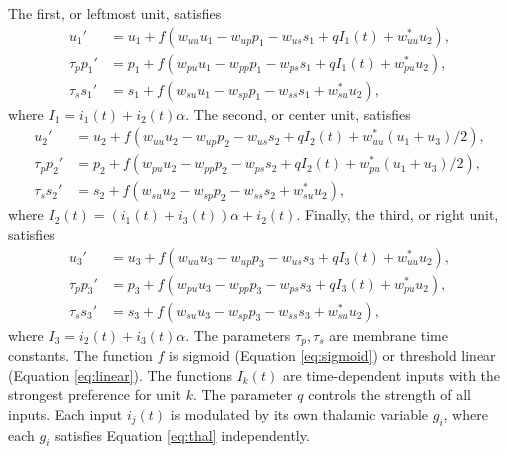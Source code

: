 \documentclass[a4paper,10pt]{article}
\begin{document}
The first, or leftmost unit, satisfies
\begin{align*}
 u_1' &= u_1 + f( w_{uu} u_1 - w_{up}p_1 - w_{us}s_1 + qI_1(t) + w_{uu}^* u_2),\\
 \tau_p p_1' &= p_1 + f( w_{pu} u_1 - w_{pp}p_1 - w_{ps}s_1 + qI_1(t) + w_{pu}^* u_2),\\
 \tau_s s_1' &= s_1 + f( w_{su} u_1 - w_{sp}p_1 - w_{ss}s_1 + w_{su}^* u_2),
\end{align*}
where $I_1 = i_1(t) +i_2(t)\alpha$. The second, or center unit, satisfies
\begin{align*}
 u_2' &= u_2 + f( w_{uu} u_2 - w_{up}p_2 - w_{us}s_2 + qI_2(t) + w_{uu}^* (u_1+u_3)/2),\\
 \tau_p p_2' &= p_2 + f( w_{pu} u_2 - w_{pp}p_2 - w_{ps}s_2 + qI_2(t) + w_{pu}^* (u_1+u_3)/2),\\
 \tau_s s_2' &= s_2 + f( w_{su} u_2 - w_{sp}p_2 - w_{ss}s_2 + w_{su}^* u_2),
\end{align*}
where $I_2(t) = (i_1(t)+i_3(t))\alpha +i_2(t)$. Finally, the third, or right unit, satisfies
\begin{align*}
u_3' &= u_3 + f( w_{uu} u_3 - w_{up}p_3 - w_{us}s_3 + qI_3(t) + w_{uu}^* u_2),\\
 \tau_p p_3' &= p_3 + f( w_{pu} u_3 - w_{pp}p_3 - w_{ps}s_3 + qI_3(t) + w_{pu}^* u_2),\\
 \tau_s s_3' &= s_3 + f( w_{su} u_3 - w_{sp}p_3 - w_{ss}s_3 + w_{su}^* u_2), 
\end{align*}
where $I_3 = i_2(t) +i_3(t)\alpha$. The parameters $\tau_p,\tau_s$ are membrane time constants. The function $f$ is sigmoid (Equation \eqref{eq:sigmoid}) or threshold linear (Equation \eqref{eq:linear}). The functions $I_k(t)$ are time-dependent inputs with the strongest preference for unit $k$. The parameter $q$ controls the strength of all inputs. Each input $i_j(t)$ is modulated by its own thalamic variable $g_i$, where each $g_i$ satisfies Equation \eqref{eq:thal} independently.
\end{document}
